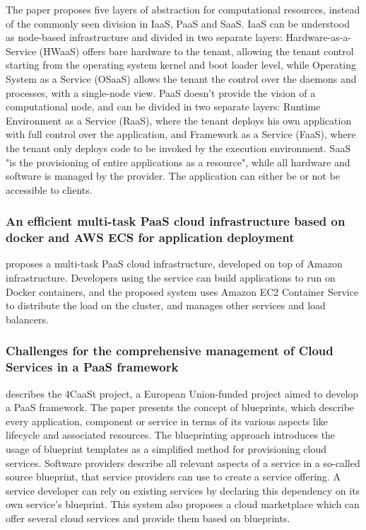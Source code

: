 The paper proposes five layers of abstraction for computational resources, instead of the commonly seen division in IaaS, PaaS and SaaS. IaaS can be understood as node-based infrastructure and divided in two separate layers: Hardware-as-a-Service (HWaaS) offers bare hardware to the tenant, allowing the tenant control starting from the operating system kernel and boot loader level, while Operating System as a Service (OSaaS) allows the tenant the control over the daemons and processes, with a single-node view. PaaS doesn't provide the vision of a computational node, and can be divided in two separate layers: Runtime Environment as a Service (RaaS), where the tenant deploys his own application with full control over the application, and Framework as a Service (FaaS), where the tenant only deploys code to be invoked by the execution environment. SaaS "is the provisioning of entire applications as a resource", while all hardware and software is managed by the provider. The application can either be or not be accessible to clients.

\subsubsection{An efficient multi-task PaaS cloud infrastructure based on docker and AWS ECS for application deployment}

 proposes a multi-task PaaS cloud infrastructure, developed on top of Amazon infrastructure. Developers using the service can build applications to run on Docker containers, and the proposed system uses Amazon EC2 Container Service to distribute the load on the cluster, and manages other services and load balancers.

\subsubsection{Challenges for the comprehensive management of Cloud Services in a PaaS framework}

 describes the 4CaaSt project, a European Union-funded project aimed to develop a PaaS framework. The paper presents the concept of blueprints, which describe every application, component or service in terms of its various aspects like lifecycle and associated resources. The blueprinting approach introduces the usage of blueprint templates as a simplified method for provisioning cloud services. Software providers describe all relevant aspects of a service in a so-called source blueprint, that service providers can use to create a service offering. A service developer can rely on existing services by declaring this dependency on its own service's blueprint. This system also proposes a cloud marketplace which can offer several cloud services and provide them based on blueprints.

